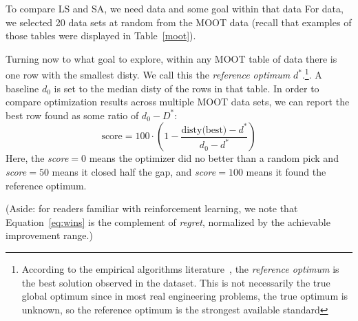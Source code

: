 \documentclass[AMA,STIX2COL]{WileyNJDv5}
\begin{document}
To compare LS and SA,  we need data and some goal
within that data
For data, we selected 20 data sets at random from the MOOT data
 (recall
that examples of those tables were displayed in 
Table~\ref{moot}). 


Turning now to what goal to explore, within any MOOT table
of data there is one row with
the smallest \textsf{disty}. We call this the {\em reference
optimum} $d^*$.\footnote{According to the
empirical algorithms literature~\cite{McGeoch2012,cohen1995empirical},
the 
{\em reference optimum} is the best solution observed in the dataset. This is not necessarily the true global optimum
since in most real engineering problems,
the true optimum is unknown, so the reference optimum is the
strongest available standard}.   A   baseline $d_0$ is set to
the median \textsf{disty} of the rows in that table.
In order to compare optimization results across multiple
MOOT data sets, we can report the best row found as some
ratio of $d_0 - D^*$: 
\begin{equation}\label{eq:wins}
  \text{score} = 100 \cdot \left( 1 - \frac{\text{disty(best)} - d^*}{d_0 - d^*} \right)
\end{equation}
Here, the {\em score}$=0$  means the optimizer did no better than a random pick and {\em score}$=50$
means it closed half the gap, and 
{\em score}$=100$ means it found the reference
optimum.

(Aside: for readers familiar with reinforcement learning,
we note that Equation~\ref{eq:wins} is the
complement of {\em regret}, normalized by the achievable
improvement range.)
\end{document}
